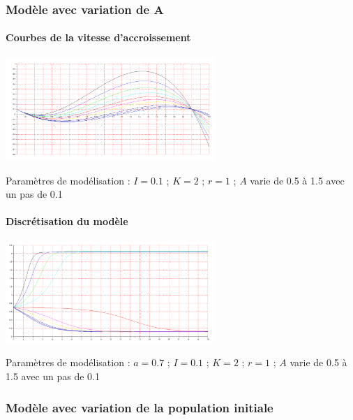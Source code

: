 \documentclass{article}
\begin{document}
\subsubsection{Modèle avec variation de A}

\paragraph{Courbes de la vitesse d'accroissement}
\begin{center}
\includegraphics[width=300px]{img/part1/AlleeA.png}
\end{center}
Paramètres de modélisation : $I=0.1$ ; $K=2$ ; $r=1$  ; $A$ varie de 0.5 à 1.5 avec un pas de 0.1
\paragraph{}

\paragraph{Discrétisation du modèle}
\begin{center}
\includegraphics[width=300px]{img/part1/TrajA.png}
\end{center}
Paramètres de modélisation : $a=0.7$ ; $I=0.1$ ; $K=2$ ; $r=1$  ; $A$ varie de 0.5 à 1.5 avec un pas de 0.1
\paragraph{}

\subsubsection{Modèle avec variation de la population initiale}
\end{document}

